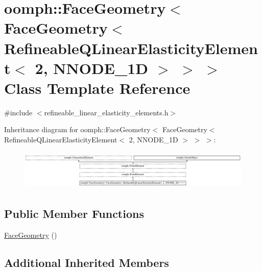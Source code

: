 \hypertarget{classoomph_1_1FaceGeometry_3_01FaceGeometry_3_01RefineableQLinearElasticityElement_3_012_00_01NNODE__1D_01_4_01_4_01_4}{}\section{oomph\+:\+:Face\+Geometry$<$ Face\+Geometry$<$ Refineable\+Q\+Linear\+Elasticity\+Element$<$ 2, N\+N\+O\+D\+E\+\_\+1D $>$ $>$ $>$ Class Template Reference}
\label{classoomph_1_1FaceGeometry_3_01FaceGeometry_3_01RefineableQLinearElasticityElement_3_012_00_01NNODE__1D_01_4_01_4_01_4}


{\ttfamily \#include $<$refineable\+\_\+linear\+\_\+elasticity\+\_\+elements.\+h$>$}

Inheritance diagram for oomph\+:\+:Face\+Geometry$<$ Face\+Geometry$<$ Refineable\+Q\+Linear\+Elasticity\+Element$<$ 2, N\+N\+O\+D\+E\+\_\+1D $>$ $>$ $>$\+:\begin{figure}[H]
\begin{center}
\leavevmode
\includegraphics[height=1.914530cm]{classoomph_1_1FaceGeometry_3_01FaceGeometry_3_01RefineableQLinearElasticityElement_3_012_00_01NNODE__1D_01_4_01_4_01_4}
\end{center}
\end{figure}
\subsection*{Public Member Functions}
\begin{DoxyCompactItemize}
\item 
\hyperlink{classoomph_1_1FaceGeometry_3_01FaceGeometry_3_01RefineableQLinearElasticityElement_3_012_00_01NNODE__1D_01_4_01_4_01_4_abf9bfda375869e8ba022101647f557d9}{Face\+Geometry} ()
\end{DoxyCompactItemize}
\subsection*{Additional Inherited Members}


